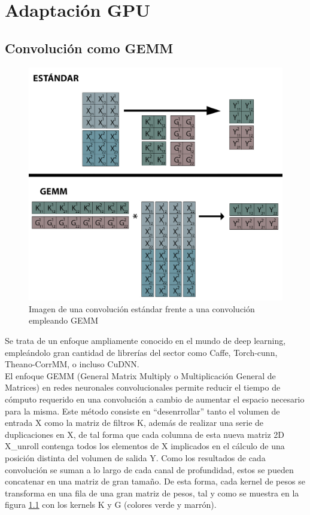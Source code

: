\chapter{Adaptación GPU}


\section{Convolución como GEMM \label{Intro_GEMMM}}

\begin{figure}[H]
	\centering
	\includegraphics[scale=0.35]{imagenes/conv_std_vs_gemm.jpg}  
	\caption{Imagen de una convolución estándar frente a una convolución empleando GEMM}
	\label{fig:conv_std_vs_gemm}
\end{figure}
Se trata de un enfoque ampliamente conocido en el mundo de deep learning, empleándolo gran cantidad de librerías del sector como Caffe, Torch-cunn, Theano-CorrMM, o incluso CuDNN. \cite{conv_GEMM_FFT_comparacion} \\
El enfoque GEMM (General Matrix Multiply o Multiplicación General de Matrices) en redes neuronales convolucionales permite reducir el tiempo de cómputo requerido en una convolución a cambio de aumentar el espacio necesario para la misma. Este método consiste en ``desenrrollar'' tanto el volumen de entrada X como la matriz de filtros K, además de realizar una serie de duplicaciones en X, de tal forma que cada columna de esta nueva matriz 2D X\_unroll contenga todos los elementos de X implicados en el cálculo de una posición distinta del volumen de salida Y. Como los resultados de cada convolución se suman a lo largo de cada canal de profundidad, estos se pueden concatenar en una matriz de gran tamaño. De esta forma, cada kernel de pesos se transforma en una fila de una gran matriz de pesos, tal y como se muestra en la figura \ref{fig:conv_std_vs_gemm} con los kernels K y G (colores verde y marrón). \\
